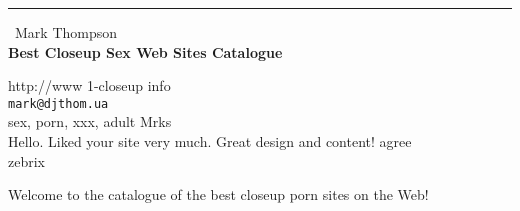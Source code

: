 \documentclass{report}
\begin{document}
\begin{center}
\rule{6in}{1pt} \
{\large Mark Thompson \\
{\bf Best Closeup Sex Web Sites Catalogue}}

http://www 1-closeup info
\\
{\tt mark@djthom.ua}\\
sex, porn, xxx, adult Mrks\\
Hello. Liked your site very much. Great design and content! agree\\
	zebrix\end{center}

Welcome to the catalogue of the best closeup porn sites on the Web!
\end{document}
